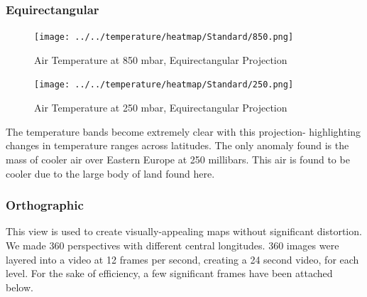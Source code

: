 \documentclass[hidelinks]{article}
\begin{document}
\subsubsection{Equirectangular}	
\begin{figure}[h!]
	\centering
	\texttt{[image: ../../temperature/heatmap/Standard/850.png]}
	\caption{Air Temperature at 850 mbar, Equirectangular Projection}
\end{figure}
\begin{figure}[h!]
	\centering
	\texttt{[image: ../../temperature/heatmap/Standard/250.png]}
	\caption{Air Temperature at 250 mbar, Equirectangular Projection}
\end{figure}
\noindent The temperature bands become extremely clear with this projection- highlighting changes in temperature ranges across latitudes. The only anomaly found is the mass of cooler air over Eastern Europe at 250 millibars. This air is found to be cooler due to the large body of land found here. 
\newpage
\subsubsection{Orthographic}
This view is used to create visually-appealing maps without significant distortion. We made 360 perspectives with different central longitudes. 360 images were layered into a video at 12 frames per second, creating a 24 second video, for each level. For the sake of efficiency, a few significant frames have been attached below.
\end{document}
